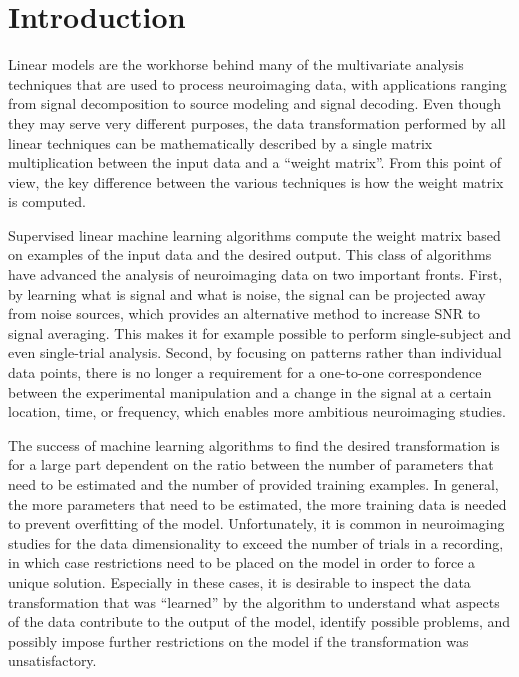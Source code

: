 \documentclass[a4paper]{vanvliet_paper}
\begin{document}
\newpage
\glsresetall

\section{Introduction}

Linear models are the workhorse behind many of the multivariate analysis techniques that are used to process neuroimaging data\cite{McIntosh2013}, with applications ranging from signal decomposition\cite{Uusitalo1997, Jutten1991, Vigario2000} to source modeling\cite{Hamalainen1994, Matsuura1995, VanVeen1997, Gross2001, Hauk2019} and signal decoding\cite{Grootswagers2017, Lotte2007, Tong2012}.
Even though they may serve very different purposes, the data transformation performed by all linear techniques can be mathematically described by a single matrix multiplication between the input data and a ``weight matrix''.
From this point of view, the key difference between the various techniques is how the weight matrix is computed.

Supervised linear machine learning algorithms compute the weight matrix based on examples of the input data and the desired output\cite{Hastie2009}.
This class of algorithms have advanced the analysis of neuroimaging data on two important fronts.
First, by learning what is signal and what is noise, the signal can be projected away from noise sources, which provides an alternative method to increase \gls{SNR} to signal averaging.
This makes it for example possible to perform single-subject and even single-trial analysis\cite{Pernet2011, Parra2003, VanVliet2016a}.
Second, by focusing on patterns rather than individual data points, there is no longer a requirement for a one-to-one correspondence between the experimental manipulation and a change in the signal at a certain location, time, or frequency, which enables more ambitious neuroimaging studies\cite{Mitchell2008, Huth2016}.

The success of machine learning algorithms to find the desired transformation is for a large part dependent on the ratio between the number of parameters that need to be estimated and the number of provided training examples.
In general, the more parameters that need to be estimated, the more training data is needed to prevent overfitting of the model\cite{Babyak2004, Blankertz2011}.
Unfortunately, it is common in neuroimaging studies for the data dimensionality to exceed the number of trials in a recording, in which case restrictions need to be placed on the model in order to force a unique solution.
Especially in these cases, it is desirable to inspect the data transformation that was ``learned'' by the algorithm to understand what aspects of the data contribute to the output of the model, identify possible problems, and possibly impose further restrictions on the model if the transformation was unsatisfactory.
\end{document}
